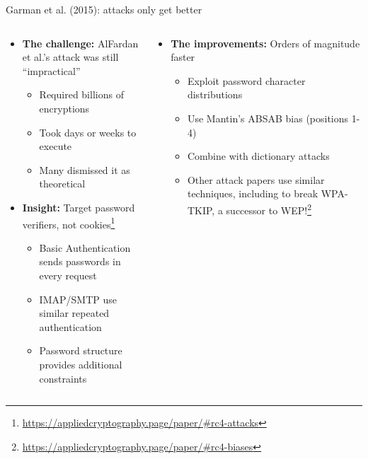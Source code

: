 \documentclass[aspectratio=169, lualatex, handout]{beamer}
\begin{document}
\begin{frame}{Garman et al. (2015): attacks only get better}
	\begin{columns}[c]
		\begin{column}{0.5\textwidth}
			\begin{itemize}
				\item \textbf{The challenge:} AlFardan et al.'s attack was still ``impractical''
				      \begin{itemize}
					      \item Required billions of encryptions
					      \item Took days or weeks to execute
					      \item Many dismissed it as theoretical
				      \end{itemize}
				\item \textbf{Insight:} Target password verifiers, not cookies\footnote{\url{https://appliedcryptography.page/paper/\#rc4-attacks}}
				      \begin{itemize}
					      \item Basic Authentication sends passwords in every request
					      \item IMAP/SMTP use similar repeated authentication
					      \item Password structure provides additional constraints
				      \end{itemize}
			\end{itemize}
		\end{column}
		\begin{column}{0.5\textwidth}
			\begin{itemize}
				\item \textbf{The improvements:} Orders of magnitude faster
				      \begin{itemize}
					      \item Exploit password character distributions
					      \item Use Mantin's ABSAB bias (positions 1-4)
					      \item Combine with dictionary attacks
					      \item Other attack papers use similar techniques, including to break WPA-TKIP, a successor to WEP!\footnote{\url{https://appliedcryptography.page/paper/\#rc4-biases}}
				      \end{itemize}
			\end{itemize}
		\end{column}
	\end{columns}
\end{frame}
\end{document}

